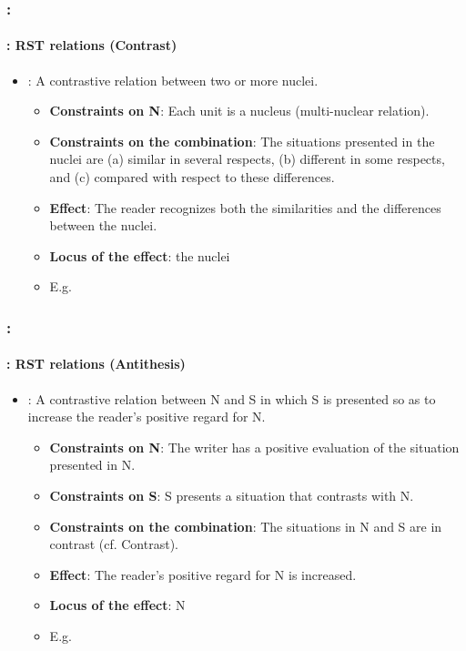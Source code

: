 \documentclass[xcolor=table]{beamer}
\begin{document}
\begin{frame}
	\frametitle{\insertshortsubtitle: \insertsection}
	\framesubtitle{\insertsubsection: RST relations (Contrast)}
	
	\begin{itemize}
		\item {}: A contrastive relation between two or more nuclei.
		\begin{itemize}
			\item \textbf{Constraints on N}: Each unit is a nucleus (multi-nuclear relation).
			\item \textbf{Constraints on the combination}: The situations presented in the nuclei are 
			(a) similar in several respects, 
			(b) different in some respects, and 
			(c) compared with respect to these differences.
			\item \textbf{Effect}: The reader recognizes both the similarities and the differences between the nuclei.
			\item \textbf{Locus of the effect}: the nuclei
			\item E.g. 
		\end{itemize}
	\end{itemize}
	
\end{frame}

\begin{frame}
	\frametitle{\insertshortsubtitle: \insertsection}
	\framesubtitle{\insertsubsection: RST relations (Antithesis)}
	
	\begin{itemize}
		\item {}: A contrastive relation between N and S in which S is presented so as to increase the reader's positive regard for N.
		\begin{itemize}
			\item \textbf{Constraints on N}: The writer has a positive evaluation of the situation presented in N.
			\item \textbf{Constraints on S}: S presents a situation that contrasts with N.
			\item \textbf{Constraints on the combination}: The situations in N and S are in contrast (cf. Contrast).
			\item \textbf{Effect}: The reader's positive regard for N is increased.
			\item \textbf{Locus of the effect}: N
			\item E.g. 
		\end{itemize}
	\end{itemize}
	
\end{frame}
\end{document}
